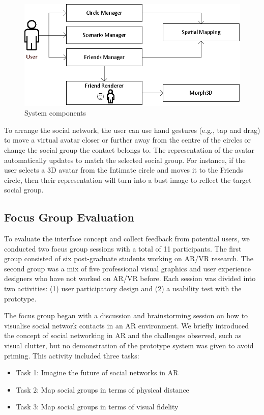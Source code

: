 \begin{figure}[ht]
  \centering
  \includegraphics[width=.8\linewidth]{images/mgia17/system-diagram.eps}
  \caption{System components}
    \label{fig:contacts:system-diagram}
\end{figure}

To arrange the social network, the user can use hand gestures (e.g., tap and drag) to move a virtual avatar closer or further away from the centre of the circles or change the social group the contact belongs to. The representation of the avatar automatically updates to match the selected social group. For instance, if the user selects a 3D avatar from the Intimate circle and moves it to the Friends circle, then their representation will turn into a bust image to reflect the target social group.

\subsection{Focus Group Evaluation}

To evaluate the interface concept and collect feedback from potential users, we conducted two focus group sessions with a total of 11 participants. The first group consisted of six post-graduate students working on AR/VR research. The second group was a mix of five professional visual graphics and user experience designers who have not worked on AR/VR before. Each session was divided into two activities: (1) user participatory design and (2) a usability test with the prototype. 

The focus group began with a discussion and brainstorming session on how to visualise social network contacts in an AR environment. We briefly introduced the concept of social networking in AR and the challenges observed, such as visual clutter, but no demonstration of the prototype system was given to avoid priming. This activity included three tasks: 

\begin{itemize}
    \item Task 1: Imagine the future of social networks in AR 
    \item Task 2: Map social groups in terms of physical distance 
    \item Task 3: Map social groups in terms of visual fidelity 
\end{itemize}


